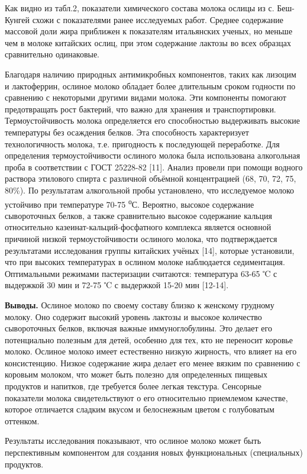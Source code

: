 \begin{multicols}{2}
Как видно из табл.2, показатели химического состава молока ослицы из с.
Беш-Кунгей схожи с показателями ранее исследуемых работ. Среднее
содержание массовой доли жира приближен к показателям итальянских
ученых, но меньше чем в молоке китайских ослиц, при этом содержание
лактозы во всех образцах сравнительно одинаковые.

Благодаря наличию природных антимикробных компонентов, таких как лизоцим
и лактоферрин, ослиное молоко обладает более длительным сроком годности
по сравнению с некоторыми другими видами молока. Эти компоненты помогают
предотвращать рост бактерий, что важно для хранения и транспортировки.
Термоустойчивость молока определяется его способностью выдерживать
высокие температуры без осаждения белков. Эта способность характеризует
технологичность молока, т.е. пригодность к последующей переработке. Для
определения термоустойчивости ослиного молока была использована
алкогольная проба в соответствии с ГОСТ 25228-82 {[}11{]}. Анализ
провели при помощи водного раствора этилового спирта с различной
объёмной концентрацией (68, 70, 72, 75, 80\%). По результатам
алкогольной пробы установлено, что исследуемое молоко устойчиво при
температуре 70-75 \textsuperscript{о}С. Вероятно, высокое содержание
сывороточных белков, а также сравнительно высокое содержание кальция
относительно казеинат-кальций-фосфатного комплекса является основной
причиной низкой термоустойчивости ослиного молока, что подтверждается
результатами исследования группы китайских учёных {[}14{]}, которые
установили, что при высоких температурах в ослином молоке наблюдается
седиментация. Оптимальными режимами пастеризации считаются: температура
63-65 ℃ с выдержкой 30 мин и 72-75 ℃ с выдержкой 15-20 мин {[}12-14{]}.

{\bfseries Выводы.} Ослиное молоко по своему составу близко к женскому
грудному молоку. Оно содержит высокий уровень лактозы и высокое
количество сывороточных белков, включая важные иммуноглобулины. Это
делает его потенциально полезным для детей, особенно для тех, кто не
переносит коровье молоко. Ослиное молоко имеет естественно низкую
жирность, что влияет на его консистенцию. Низкое содержание жира делает
его менее вязким по сравнению с коровьим молоком, что может быть полезно
для определенных пищевых продуктов и напитков, где требуется более
легкая текстура. Сенсорные показатели молока свидетельствуют о его
относительно приемлемом качестве, которое отличается сладким вкусом и
белоснежным цветом с голубоватым оттенком.

Результаты исследования показывают, что ослиное молоко может быть
перспективным компонентом для создания новых функциональных
(специальных) продуктов.
\end{multicols}

